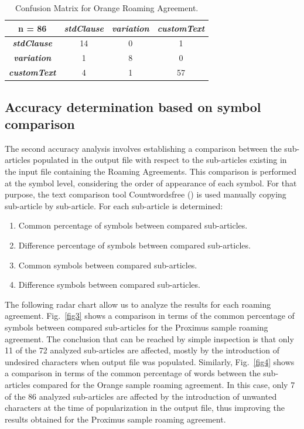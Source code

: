 \documentclass[conference]{style/IEEEtran}
\begin{document}
\begin{table}[htbp]
\caption{Confusion Matrix for Orange Roaming Agreement.}
\begin{center}
\begin{tabular}{|c|c|c|c|}
\hline
\textbf{n = 86} & \textbf{\textit{stdClause}}& \textbf{\textit{variation}}& \textbf{\textit{customText}} \\
\hline
\textbf{\textit{stdClause}}& 14 & 0 & 1 \\
\hline
\textbf{\textit{variation}}& 1 & 8 & 0 \\
\hline
\textbf{\textit{customText}}& 4 & 1 & 57 \\
\hline
\end{tabular}
\label{table2}
\end{center}
\end{table}

\subsection{Accuracy determination based on symbol comparison}
The second accuracy analysis involves establishing a comparison between the sub-articles populated in the output file with respect to the sub-articles existing in the input file containing the Roaming Agreements. This comparison is performed at the symbol level, considering the order of appearance of each symbol. For that purpose, the text comparison tool Countwordsfree (\cite{countwordsfree}) is used manually copying sub-article by sub-article. For each sub-article is determined:

\begin{enumerate}
\item Common percentage of symbols between compared sub-articles.
\item Difference percentage of symbols between compared sub-articles.
\item Common symbols between compared sub-articles.
\item Difference symbols between compared sub-articles.
\end{enumerate}

The following radar chart allow us to analyze the results for each roaming agreement. Fig.~\ref{fig3} shows a comparison in terms of the common percentage of symbols between compared sub-articles for the Proximus sample roaming agreement. The conclusion that can be reached by simple inspection is that only 11 of the 72 analyzed sub-articles are affected, mostly by the introduction of undesired characters when output file was populated. Similarly, Fig.~\ref{fig4} shows a comparison in terms of the common percentage of words between the sub-articles compared for the Orange sample roaming agreement. In this case, only 7 of the 86 analyzed sub-articles are affected by the introduction of unwanted characters at the time of popularization in the output file, thus improving the results obtained for the Proximus sample roaming agreement.
\end{document}
